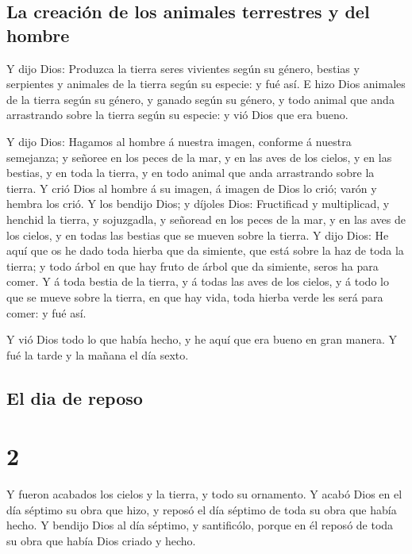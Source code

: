 \hypertarget{la-creaciuxf3n-de-los-animales-terrestres-y-del-hombre}{%
\subsection{La creación de los animales terrestres y del
hombre}\label{la-creaciuxf3n-de-los-animales-terrestres-y-del-hombre}}

 Y dijo Dios: Produzca la tierra seres vivientes según su
género, bestias y serpientes y animales de la tierra según su especie: y
fué así.  E hizo Dios animales de la tierra según su
género, y ganado según su género, y todo animal que anda arrastrando
sobre la tierra según su especie: y vió Dios que era bueno.

 Y dijo Dios: Hagamos al hombre á nuestra imagen,
conforme á nuestra semejanza; y señoree en los peces de la mar, y en las
aves de los cielos, y en las bestias, y en toda la tierra, y en todo
animal que anda arrastrando sobre la tierra.  Y crió Dios
al hombre á su imagen, á imagen de Dios lo crió; varón y hembra los
crió.  Y los bendijo Dios; y díjoles Dios: Fructificad y
multiplicad, y henchid la tierra, y sojuzgadla, y señoread en los peces
de la mar, y en las aves de los cielos, y en todas las bestias que se
mueven sobre la tierra.  Y dijo Dios: He aquí que os he
dado toda hierba que da simiente, que está sobre la haz de toda la
tierra; y todo árbol en que hay fruto de árbol que da simiente, seros ha
para comer.  Y á toda bestia de la tierra, y á todas las
aves de los cielos, y á todo lo que se mueve sobre la tierra, en que hay
vida, toda hierba verde les será para comer: y fué así.

 Y vió Dios todo lo que había hecho, y he aquí que era
bueno en gran manera. Y fué la tarde y la mañana el día sexto.

\hypertarget{el-dia-de-reposo}{%
\subsection{El dia de reposo}\label{el-dia-de-reposo}}

\hypertarget{section-01-2}{%
\section{2}\label{section-01-2}}

 Y fueron acabados los cielos y la tierra, y todo su
ornamento.  Y acabó Dios en el día séptimo su obra que
hizo, y reposó el día séptimo de toda su obra que había hecho.
 Y bendijo Dios al día séptimo, y santificólo, porque en
él reposó de toda su obra que había Dios criado y hecho.

